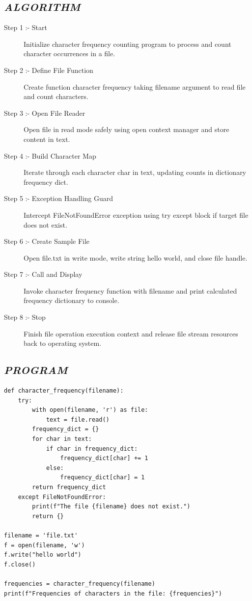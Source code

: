 \documentclass[11pt,a4paper]{article}
\begin{document}
\subsection*{\textit{ALGORITHM}}
\begin{description}
  \item[Step 1 :- Start] Initialize character frequency counting program to process and count character occurrences in a file.
  \item[Step 2 :- Define File Function] Create function character frequency taking filename argument to read file and count characters.
  \item[Step 3 :- Open File Reader] Open file in read mode safely using open context manager and store content in text.
  \item[Step 4 :- Build Character Map] Iterate through each character char in text, updating counts in dictionary frequency dict.
  \item[Step 5 :- Exception Handling Guard] Intercept FileNotFoundError exception using try except block if target file does not exist.
  \item[Step 6 :- Create Sample File] Open file.txt in write mode, write string hello world, and close file handle.
  \item[Step 7 :- Call and Display] Invoke character frequency function with filename and print calculated frequency dictionary to console.
  \item[Step 8 :- Stop] Finish file operation execution context and release file stream resources back to operating system.
\end{description}

\subsection*{\textit{PROGRAM}}
\begin{lstlisting}[style=pythonstyle]
def character_frequency(filename): 
    try: 
        with open(filename, 'r') as file: 
            text = file.read() 
        frequency_dict = {} 
        for char in text: 
            if char in frequency_dict: 
                frequency_dict[char] += 1 
            else: 
                frequency_dict[char] = 1 
        return frequency_dict 
    except FileNotFoundError: 
        print(f"The file {filename} does not exist.") 
        return {} 

filename = 'file.txt' 
f = open(filename, 'w') 
f.write("hello world") 
f.close() 

frequencies = character_frequency(filename) 
print(f"Frequencies of characters in the file: {frequencies}")
\end{lstlisting}
\end{document}
